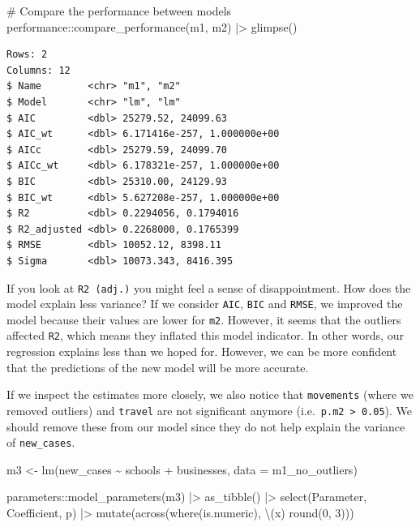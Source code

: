 \documentclass[
  letterpaper,
  DIV=11,
  numbers=noendperiod]{scrreprt}
\newenvironment{Shaded}{\begin{snugshade}}{\end{snugshade}}
\newcommand{\AttributeTok}[1]{\textcolor[rgb]{0.40,0.45,0.13}{#1}}
\newcommand{\CommentTok}[1]{\textcolor[rgb]{0.37,0.37,0.37}{#1}}
\newcommand{\DecValTok}[1]{\textcolor[rgb]{0.68,0.00,0.00}{#1}}
\newcommand{\FunctionTok}[1]{\textcolor[rgb]{0.28,0.35,0.67}{#1}}
\newcommand{\NormalTok}[1]{\textcolor[rgb]{0.00,0.23,0.31}{#1}}
\newcommand{\OtherTok}[1]{\textcolor[rgb]{0.00,0.23,0.31}{#1}}
\newcommand{\SpecialCharTok}[1]{\textcolor[rgb]{0.37,0.37,0.37}{#1}}
\begin{document}
\begin{Shaded}
\begin{Highlighting}[]
\CommentTok{\# Compare the performance between models}
\NormalTok{performance}\SpecialCharTok{::}\FunctionTok{compare\_performance}\NormalTok{(m1, m2) }\SpecialCharTok{|\textgreater{}}
  \FunctionTok{glimpse}\NormalTok{()}
\end{Highlighting}
\end{Shaded}

\begin{verbatim}
Rows: 2
Columns: 12
$ Name        <chr> "m1", "m2"
$ Model       <chr> "lm", "lm"
$ AIC         <dbl> 25279.52, 24099.63
$ AIC_wt      <dbl> 6.171416e-257, 1.000000e+00
$ AICc        <dbl> 25279.59, 24099.70
$ AICc_wt     <dbl> 6.178321e-257, 1.000000e+00
$ BIC         <dbl> 25310.00, 24129.93
$ BIC_wt      <dbl> 5.627208e-257, 1.000000e+00
$ R2          <dbl> 0.2294056, 0.1794016
$ R2_adjusted <dbl> 0.2268000, 0.1765399
$ RMSE        <dbl> 10052.12, 8398.11
$ Sigma       <dbl> 10073.343, 8416.395
\end{verbatim}

If you look at \texttt{R2\ (adj.)} you might feel a sense of
disappointment. How does the model explain less variance? If we consider
\texttt{AIC}, \texttt{BIC} and \texttt{RMSE}, we improved the model
because their values are lower for \texttt{m2}. However, it seems that
the outliers affected \texttt{R2}, which means they inflated this model
indicator. In other words, our regression explains less than we hoped
for. However, we can be more confident that the predictions of the new
model will be more accurate.

If we inspect the estimates more closely, we also notice that
\texttt{movements} (where we removed outliers) and \texttt{travel} are
not significant anymore (i.e.~\texttt{p.m2\ \textgreater{}\ 0.05}). We
should remove these from our model since they do not help explain the
variance of \texttt{new\_cases}.

\begin{Shaded}
\begin{Highlighting}[]
\NormalTok{m3 }\OtherTok{\textless{}{-}} \FunctionTok{lm}\NormalTok{(new\_cases }\SpecialCharTok{\textasciitilde{}}\NormalTok{ schools }\SpecialCharTok{+}\NormalTok{ businesses,}
         \AttributeTok{data =}\NormalTok{ m1\_no\_outliers)}

\NormalTok{parameters}\SpecialCharTok{::}\FunctionTok{model\_parameters}\NormalTok{(m3) }\SpecialCharTok{|\textgreater{}}
  \FunctionTok{as\_tibble}\NormalTok{() }\SpecialCharTok{|\textgreater{}}
  \FunctionTok{select}\NormalTok{(Parameter, Coefficient, p) }\SpecialCharTok{|\textgreater{}}
  \FunctionTok{mutate}\NormalTok{(}\FunctionTok{across}\NormalTok{(}\FunctionTok{where}\NormalTok{(is.numeric), \textbackslash{}(x) }\FunctionTok{round}\NormalTok{(}\DecValTok{0}\NormalTok{, }\DecValTok{3}\NormalTok{)))}
\end{Highlighting}
\end{Shaded}
\end{document}
